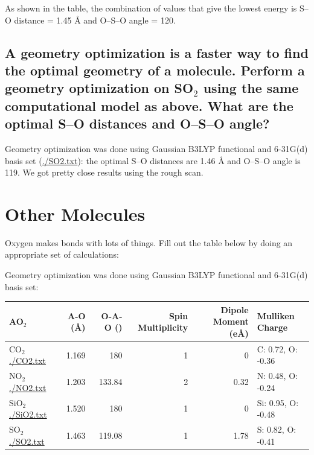 \documentclass[11pt]{article}
\begin{document}
As shown in the table, the combination of values that give the lowest energy is S–O distance = 1.45 \AA{} and O–S–O angle = 120\textdegree{}.

\subsection{A geometry optimization is a faster way to find the optimal geometry of a molecule. Perform a geometry optimization on SO\(_{\text{2}}\) using the same computational model as above. What are the optimal S–O distances and O–S–O angle?}
\label{sec:org83a1758}

Geometry optimization was done using Gaussian B3LYP functional and 6-31G(d) basis set (\url{./SO2.txt}): the optimal S–O distances are 1.46 \AA{} and O–S–O angle is 119\textdegree{}. We got pretty close results using the rough scan.

\section{Other Molecules}
\label{sec:orgadc0258}

Oxygen makes bonds with lots of things. Fill out the table below by doing an appropriate set of calculations:

Geometry optimization was done using Gaussian B3LYP functional and 6-31G(d) basis set:

\begin{center}
\begin{tabular}{lrrrrl}
AO\(_{\text{2}}\) & A-O (\AA{}) & O-A-O (\textdegree{}) & Spin Multiplicity & Dipole Moment (e\AA{}) & Mulliken Charge\\
\hline
CO\(_{\text{2}}\) \url{./CO2.txt} & 1.169 & 180 & 1 & 0 & C: 0.72, O: -0.36\\
NO\(_{\text{2}}\) \url{./NO2.txt} & 1.203 & 133.84 & 2 & 0.32 & N: 0.48, O: -0.24\\
SiO\(_{\text{2}}\)\url{./SiO2.txt} & 1.520 & 180 & 1 & 0 & Si: 0.95, O: -0.48\\
SO\(_{\text{2}}\) \url{./SO2.txt} & 1.463 & 119.08 & 1 & 1.78 & S: 0.82, O: -0.41\\
\end{tabular}
\end{center}
\end{document}
